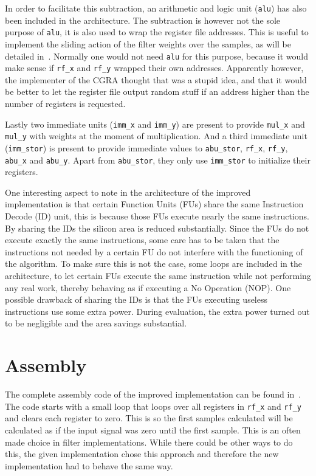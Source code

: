 \documentclass[10pt,twocolumn]{article}
\begin{document}
In order to facilitate this subtraction, an arithmetic and logic unit
(\texttt{alu}) has also been included in the architecture. The
subtraction is however not the sole purpose of \texttt{alu}, it is
also used to wrap the register file addresses. This is useful to
implement the sliding action of the filter weights over the samples,
as will be detailed in~. Normally one would not
need \texttt{alu} for this purpose, because it would make sense if
\texttt{rf\_x} and \texttt{rf\_y} wrapped their own addresses.
Apparently however, the implementer of the CGRA thought that was a
stupid idea, and that it would be better to let the register file
output random stuff if an address higher than the number of registers
is requested.

Lastly two immediate units (\texttt{imm\_x} and \texttt{imm\_y}) are
present to provide \texttt{mul\_x} and \texttt{mul\_y} with weights at
the moment of multiplication. And a third immediate unit
(\texttt{imm\_stor}) is present to provide immediate values to
\texttt{abu\_stor}, \texttt{rf\_x}, \texttt{rf\_y}, \texttt{abu\_x}
and \texttt{abu\_y}. Apart from \texttt{abu\_stor}, they only use
\texttt{imm\_stor} to initialize their registers.

One interesting aspect to note in the architecture of the improved
implementation is that certain Function Units (FUs) share the same
Instruction Decode (ID) unit, this is because those FUs execute nearly
the same instructions. By sharing the IDs the silicon area is reduced
substantially. Since the FUs do not execute exactly the same
instructions, some care has to be taken that the instructions not
needed by a certain FU do not interfere with the functioning of the
algorithm. To make sure this is not the case, some loops are included
in the architecture, to let certain FUs execute the same instruction
while not performing any real work, thereby behaving as if executing a
No Operation (NOP). One possible drawback of sharing the IDs is that
the FUs executing useless instructions use some extra power. During
evaluation, the extra power turned out to be negligible and the area
savings substantial.

\section{Assembly}
\label{sec:assembly}
The complete assembly code of the improved implementation can be found
in~. The code starts with a small loop that loops
over all registers in \texttt{rf\_x} and \texttt{rf\_y} and clears
each register to zero. This is so the first samples calculated will be
calculated as if the input signal was zero until the first sample.
This is an often made choice in filter implementations. While there
could be other ways to do this, the given implementation chose this
approach and therefore the new implementation had to behave the same
way.
\end{document}
